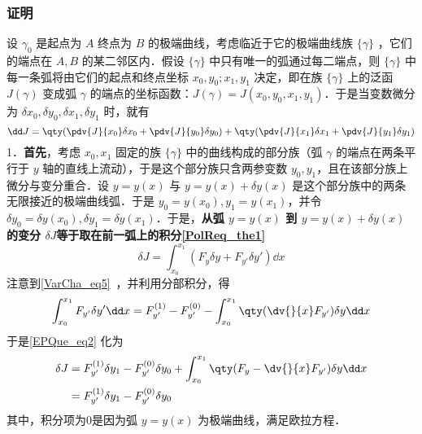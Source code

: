 \subsubsection{证明}
设 $\gamma_0$ 是起点为 $A$ 终点为 $B$ 的极端曲线，考虑临近于它的极端曲线族 $\{\gamma\}$ ，它们的端点在 $A,B$ 的某二邻区内．假设 $\{\gamma\}$ 中只有唯一的弧通过每二端点，则 $\{\gamma\}$ 中每一条弧将由它们的起点和终点坐标 $x_0,y_0;x_1,y_1$ 决定，即在族 $\{\gamma\}$ 上的泛函 $J(\gamma)$ 变成弧 $\gamma$ 的端点的坐标函数：$J(\gamma)=J(x_0,y_0,x_1,y_1)$．于是当变数微分为 $\delta x_0,\delta y_0,\delta x_1,\delta y_1$ 时，就有
\begin{equation}
\dd J=\qty(\pdv{J}{x_0}\delta x_0+\pdv{J}{y_0}\delta y_0)+\qty(\pdv{J}{x_1}\delta x_1+\pdv{J}{y_1}\delta y_1)
\end{equation}
1．\textbf{首先}，考虑 $x_0,x_1$ 固定的族 $\{\gamma\}$ 中的曲线构成的部分族（弧 $\gamma$ 的端点在两条平行于 $y$ 轴的直线上流动），于是这个部分族只含两参变数 $y_0,y_1$，且在该部分族上微分与变分重合．设 $y=y(x)$ 与 $y=y(x)+\delta y(x)$ 是这个部分族中的两条无限接近的极端曲线弧．于是 $y_0=y(x_0),y_1=y(x_1)$，并令 $\delta y_0=\delta y(x_0),\delta y_1=\delta y(x_1)$．于是，\textbf{从弧 $y=y(x)$ 到 $y=y(x)+\delta y(x)$ 的变分 $\delta J$等于取在前一弧上的积分\autoref{PolReq_the1}~}
\begin{equation}\label{EPQue_eq2}
\delta J=\int_{x_0}^{x_1}(F_{y}\delta y+F_{y'}\delta y')\dd x
\end{equation}
注意到\autoref{VarCha_eq5}~，并利用分部积分，得
\begin{equation}
\int_{x_0}^{x_1}F_{y'}\delta y' \dd x=F_{y'}^{(1)}-F_{y'}^{(0)}-\int_{x_0}^{x_1}\qty(\dv{}{x}F_{y'})\delta y\dd x
\end{equation}
于是\autoref{EPQue_eq2} 化为
\begin{equation}
\begin{aligned}
\delta J&=F_{y'}^{(1)}\delta y_1-F_{y'}^{(0)}\delta y_0+\int_{x_0}^{x_1}\qty(F_y-\dv{}{x}F_{y'})\delta y\dd x\\
&=F_{y'}^{(1)}\delta y_1-F_{y'}^{(0)}\delta y_0
\end{aligned}
\end{equation}
其中，积分项为0是因为弧 $y=y(x)$ 为极端曲线，满足欧拉方程．

